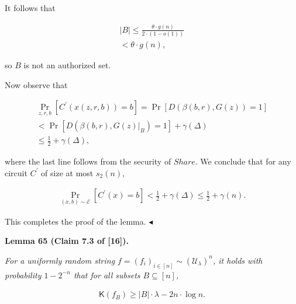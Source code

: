 It follows that\par


\[\begin{gathered}
\displaystyle|B| \displaystyle\leq\frac{\theta\cdot g(n)}{2\cdot(1-o(1))} \\
\displaystyle<\theta\cdot g(n),
\end{gathered}\]


so $B$ is not an authorized set.\par




Now observe that\par


\[\begin{gathered}
\displaystyle\Pr_{z,r,b}[C^{\prime}(x(z,r,b))=b] \displaystyle=\Pr[D(\beta(b,r),G(z))=1] \\
\displaystyle<\Pr[D(\beta(b,r),G(z)|_{B})=1]+\gamma(\Delta) \\
\displaystyle\leq\frac{1}{2}+\gamma(\Delta),
\end{gathered}\]


where the last line follows from the security of $Share$. We conclude that for any circuit $C^{\prime}$ of size at most $s_{2}(n)$,\par


\[\begin{gathered}
\Pr_{(x,b)\sim\mathcal{E}}[C^{\prime}(x)=b]<\frac{1}{2}+\gamma(\Delta)\leq\frac{1}{2}+\gamma(n).
\end{gathered}\]


This completes the proof of the lemma.
$\blacktriangleleft$\par





\par\medskip\noindent\textbf{
\textbf{Lemma 65}\textbf{ }(Claim 7.3 of [16])\textbf{.}
}\par



\emph{For a uniformly random string $f=(f_{i})_{i\in[n]}\sim(\mathcal{U}_{\lambda})^{n}$, it holds with probability $1-2^{-n}$ that for all subsets $B\subseteq[n]$,}\par


\[\begin{gathered}
{\mathsf{K}}(f_{B})\geq|B|\cdot\lambda-2n\cdot\log n.
\end{gathered}\]






